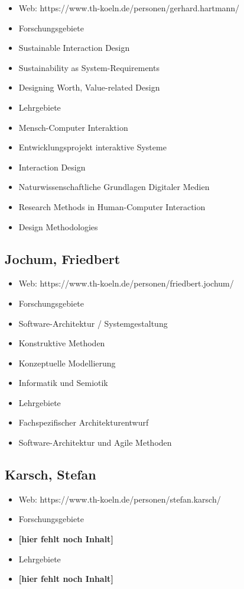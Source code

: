 \begin{itemize}
\item
  Web: https://www.th-koeln.de/personen/gerhard.hartmann/
\item
  Forschungsgebiete
\item
  Sustainable Interaction Design
\item
  Sustainability as System-Requirements
\item
  Designing Worth, Value-related Design
\item
  Lehrgebiete
\item
  Mensch-Computer Interaktion
\item
  Entwicklungsprojekt interaktive Systeme
\item
  Interaction Design
\item
  Naturwissenschaftliche Grundlagen Digitaler Medien
\item
  Research Methods in Human-Computer Interaction
\item
  Design Methodologies
\end{itemize}

\subsection{Jochum, Friedbert}\label{jochum-friedbert}

\begin{itemize}
\item
  Web: https://www.th-koeln.de/personen/friedbert.jochum/
\item
  Forschungsgebiete
\item
  Software-Architektur / Systemgestaltung
\item
  Konstruktive Methoden
\item
  Konzeptuelle Modellierung~
\item
  Informatik und Semiotik
\item
  Lehrgebiete
\item
  Fachspezifischer Architekturentwurf
\item
  Software-Architektur und Agile Methoden~
\end{itemize}

\subsection{Karsch, Stefan}\label{karsch-stefan}

\begin{itemize}
\tightlist
\item
  Web: https://www.th-koeln.de/personen/stefan.karsch/
\item
  Forschungsgebiete
\item
  \textbf{{[}hier fehlt noch Inhalt{]}}
\item
  Lehrgebiete
\item
  \textbf{{[}hier fehlt noch Inhalt{]}}
\end{itemize}

